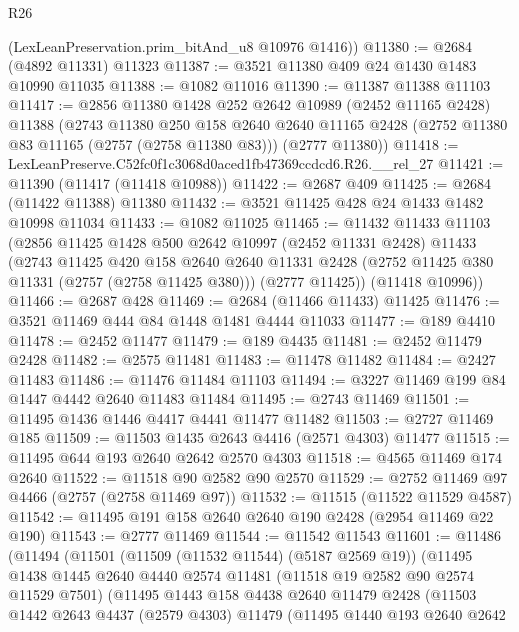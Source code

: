 \begin{lexlean}{R26}
\begin{coremodule}
      (LexLeanPreservation.prim_bitAnd_u8 @10976 @1416))
@11380 := @2684 (@4892 @11331) @11323
@11387 := @3521 @11380 @409 @24 @1430 @1483 @10990 @11035
@11388 := @1082 @11016
@11390 := @11387 @11388 @11103
@11417 := @2856
    @11380
    @1428
    @252
    @2642
    @10989
    (@2452 @11165 @2428)
    @11388
    (@2743
      @11380
      @250
      @158
      @2640
      @2640
      @11165
      @2428
      (@2752 @11380 @83 @11165 (@2757 (@2758 @11380 @83)))
      (@2777 @11380))
@11418 := LexLeanPreserve.C52fc0f1c3068d0aced1fb47369ccdcd6.R26.__rel_27
@11421 := @11390 (@11417 (@11418 @10988))
@11422 := @2687 @409
@11425 := @2684 (@11422 @11388) @11380
@11432 := @3521 @11425 @428 @24 @1433 @1482 @10998 @11034
@11433 := @1082 @11025
@11465 := @11432
    @11433
    @11103
    (@2856
      @11425
      @1428
      @500
      @2642
      @10997
      (@2452 @11331 @2428)
      @11433
      (@2743
        @11425
        @420
        @158
        @2640
        @2640
        @11331
        @2428
        (@2752 @11425 @380 @11331 (@2757 (@2758 @11425 @380)))
        (@2777 @11425))
      (@11418 @10996))
@11466 := @2687 @428
@11469 := @2684 (@11466 @11433) @11425
@11476 := @3521 @11469 @444 @84 @1448 @1481 @4444 @11033
@11477 := @189 @4410
@11478 := @2452 @11477
@11479 := @189 @4435
@11481 := @2452 @11479 @2428
@11482 := @2575 @11481
@11483 := @11478 @11482
@11484 := @2427 @11483
@11486 := @11476 @11484 @11103
@11494 := @3227 @11469 @199 @84 @1447 @4442 @2640 @11483 @11484
@11495 := @2743 @11469
@11501 := @11495 @1436 @1446 @4417 @4441 @11477 @11482
@11503 := @2727 @11469 @185
@11509 := @11503 @1435 @2643 @4416 (@2571 @4303) @11477
@11515 := @11495 @644 @193 @2640 @2642 @2570 @4303
@11518 := @4565 @11469 @174 @2640
@11522 := @11518 @90 @2582 @90 @2570
@11529 := @2752 @11469 @97 @4466 (@2757 (@2758 @11469 @97))
@11532 := @11515 (@11522 @11529 @4587)
@11542 := @11495 @191 @158 @2640 @2640 @190 @2428 (@2954 @11469 @22 @190)
@11543 := @2777 @11469
@11544 := @11542 @11543
@11601 := @11486
    (@11494
      (@11501
        (@11509 (@11532 @11544) (@5187 @2569 @19))
        (@11495
          @1438
          @1445
          @2640
          @4440
          @2574
          @11481
          (@11518 @19 @2582 @90 @2574 @11529 @7501)
          (@11495
            @1443
            @158
            @4438
            @2640
            @11479
            @2428
            (@11503
              @1442
              @2643
              @4437
              (@2579 @4303)
              @11479
              (@11495
                @1440
                @193
                @2640
                @2642

\end{coremodule}
\end{lexlean}
